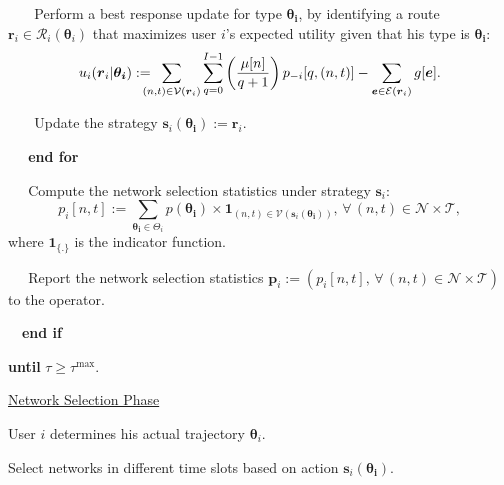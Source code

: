 \documentclass[journal]{IEEEtran}
\newcommand{\mc}[1]{\mathcal{#1}}
\newcommand{\bs}[1]{\boldsymbol{#1}}
\begin{document}
\begin{algorithm} [t]
\begin{algorithmic} [1]
\STATE $ \ \ \ \ \ \ \ $ Perform a best response update for type $\bs{\theta_i}$, by \STATEx \quad\quad\quad\quad identifying a route $\bs{r}_i \in \mathcal{R}_i(\boldsymbol{\theta}_i)$ that maximizes \STATEx \quad\quad\quad\quad user $i$'s expected utility given that his type is $\bs{\theta_i}$: %
%
\begin{equation} \label{equ:utility_br}
	u_i(\boldsymbol{r}_i|\boldsymbol{\theta_i}) := \hspace{-0.3cm} \displaystyle\sum_{(n,t) \in \mc{V}(\boldsymbol{r}_i)} \sum_{q=0}^{I-1} \left( \frac{\mu[n]}{q + 1} \right) p_{-i}[q,(n,t)] - \sum_{\boldsymbol{e} \in \mathcal{E}(\boldsymbol{r}_i)} g[\boldsymbol{e}]. %
\end{equation}
%	

\STATE $ \ \ \ \ \ \ \ $ Update the strategy $\boldsymbol{s}_i(\boldsymbol{\theta_i}) := \bs{r}_i$.

\STATE $ \ \ \ \ \ $ \textbf{end for}

\STATE $ \ \ \ \ \ $ Compute the network selection statistics under strategy $\boldsymbol{s}_i$:
%
\begin{equation} \label{equ:pint}
	p_i[n,t] := \sum_{\bs{\theta_i} \in \Theta_i} p(\bs{\theta_i}) \times \textbf{1}_{(n,t) \in \mc{V}(\bs{s}_i(\bs{\theta_i}))}, \, \forall \, (n,t) \in \mc{N} \times \mc{T},
\end{equation}
% 
\quad\quad\quad where $\textbf{1}_{\{.\}}$ is the indicator function.

\STATE $ \ \ \ \ \ $ Report the network selection statistics \STATEx \quad\quad\quad\quad $\bs{p}_i := (p_i[n,t], \, \forall \, (n,t) \in \mathcal{N} \times \mathcal{T})$ to the operator.

\STATE $ \ \ \ $ \textbf{end if}

\STATE \textbf{until} $\tau \geq \tau^{\text{max}}$.


\STATEx \underline{Network Selection Phase}

\STATE User $i$ determines his actual trajectory $\boldsymbol{\theta}_i$.

\STATE Select networks in different time slots based on action $\boldsymbol{s}_i(\boldsymbol{\theta_i})$. %

\end{algorithmic} \label{algo:ns_mu}
\end{algorithm}

\end{document}
